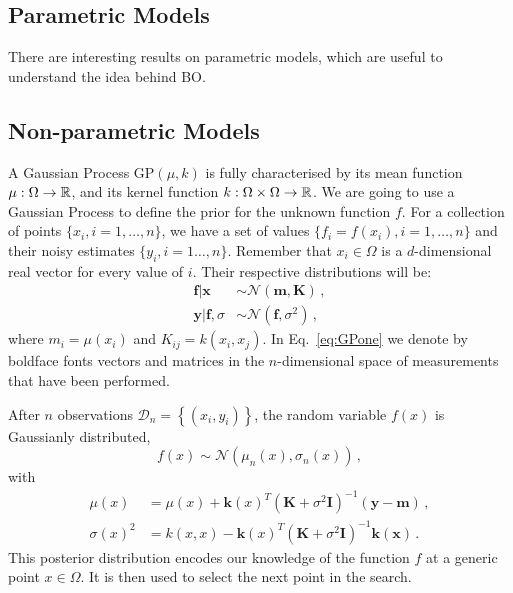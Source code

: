 \subsection{Parametric Models}
\label{sec:BaysParMod}

There are interesting results on parametric models, which are useful to understand the idea behind BO. 

\subsection{Non-parametric Models}
\label{sec:BaysNonParMod}

A Gaussian Process $\mathrm{GP}(\mu, k)$ is fully characterised by its mean
function $\mu: \Omega\to \mathbb{R}$, and its kernel function $k: \Omega \times \Omega
\to \mathbb{R}$. We are going to use a Gaussian Process to define the prior for the
unknown function $f$. For a collection of points $\{x_i, i=1,\ldots,n\}$, we
have a set of values $\{f_i=f(x_i), i=1,\ldots,n\}$ and their noisy estimates
$\{y_i, i=1\ldots, n\}$. Remember that $x_i\in\Omega$ is a $d$-dimensional real
vector for every value of $i$. Their respective distributions will be: 
\begin{align}
    \label{eq:GPone}
    \mathbf{f}|\mathbf{x} &\sim 
        \mathcal{N}\left(\mathbf{m},\mathbf{K}\right)\, ,\\
    \mathbf{y}|\mathbf{f},\sigma &\sim 
        \mathcal{N}\left(\mathbf{f},\sigma^2\right)\, ,
\end{align}
where $m_i=\mu(x_i)$ and $K_{ij}=k(x_i,x_j)$. In Eq.~\eqref{eq:GPone} we denote
by boldface fonts vectors and matrices in the $n$-dimensional space of
measurements that have been performed. 

After $n$ observations $\mathcal{D}_n=\left\{\left(x_i,y_i\right)\right\}$, the random variable $f(x)$ is Gaussianly distributed, 
\begin{equation}
    \label{eq:PostGaussF}
    f(x)\sim \mathcal{N}\left(\mu_n(x),\sigma_n(x)\right)\, ,
\end{equation}
with
\begin{align}
    \label{eq:PostParams}
    \mu(x) &= \mu(x) + \mathbf{k}(x)^T \left(\mathbf{K} + \sigma^2 \mathbf{I}\right)^{-1} \left(\mathbf{y}-\mathbf{m}\right)\, , \\
    \sigma(x)^2 &= k(x,x) - \mathbf{k}(x)^T \left(\mathbf{K} + \sigma^2 \mathbf{I}\right)^{-1} \mathbf{k}(\mathbf{x})\, .
\end{align}
This posterior distribution encodes our knowledge of the function $f$ at a
generic point $x\in\Omega$. It is then used to select the next point in the
search. 

